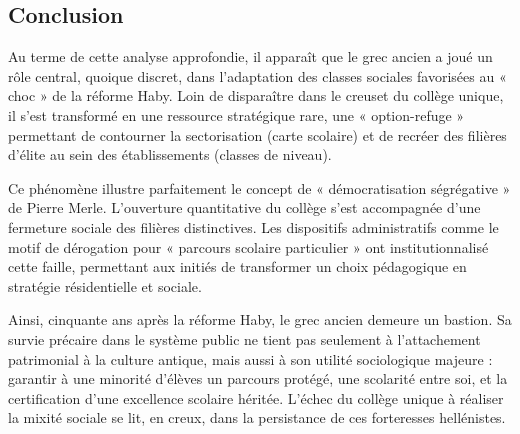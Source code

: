 \subsection{Conclusion}

Au terme de cette analyse approfondie, il apparaît que le grec ancien a joué un rôle central,
quoique discret, dans l'adaptation des classes sociales favorisées au « choc » de la réforme Haby.
Loin de disparaître dans le creuset du collège unique, il s'est transformé en une ressource
stratégique rare, une « option-refuge » permettant de contourner la sectorisation (carte scolaire)
et de recréer des filières d'élite au sein des établissements (classes de niveau).

Ce phénomène illustre parfaitement le concept de « démocratisation ségrégative » de Pierre Merle.
L'ouverture quantitative du collège s'est accompagnée d'une fermeture sociale des filières
distinctives. Les dispositifs administratifs comme le motif de dérogation pour « parcours scolaire
particulier » ont institutionnalisé cette faille, permettant aux initiés de transformer un choix
pédagogique en stratégie résidentielle et sociale.

Ainsi, cinquante ans après la réforme Haby, le grec ancien demeure un bastion. Sa survie précaire
dans le système public ne tient pas seulement à l'attachement patrimonial à la culture antique, mais
aussi à son utilité sociologique majeure : garantir à une minorité d'élèves un parcours protégé, une
scolarité entre soi, et la certification d'une excellence scolaire héritée. L'échec du collège
unique à réaliser la mixité sociale se lit, en creux, dans la persistance de ces forteresses
hellénistes.

